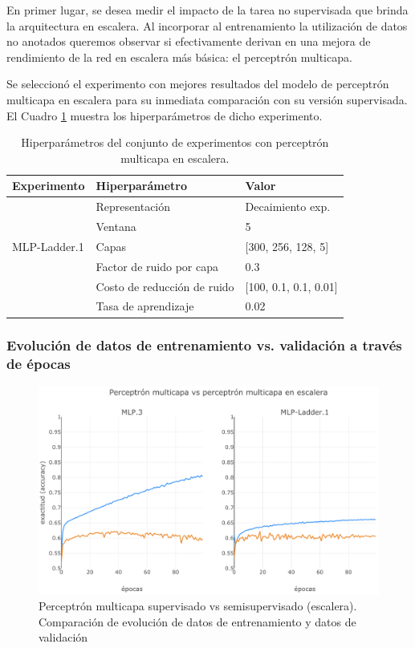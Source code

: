 En primer lugar, se desea medir el impacto de la tarea no supervisada que brinda la arquitectura en escalera. 
Al incorporar al entrenamiento la utilización de datos no anotados queremos observar si efectivamente derivan 
en una mejora de rendimiento de la red en escalera más básica: el perceptrón multicapa.

Se seleccionó el experimento con mejores resultados del modelo de perceptrón multicapa en escalera para su 
inmediata comparación con su versión supervisada. El Cuadro \ref{tab:exp:mlp_ladder} muestra los 
hiperparámetros de dicho experimento.

\begin{table}[t]
    \centering
    \begin{tabular}{|l|l|l|}
        \hline
        \textbf{Experimento} & \textbf{Hiperparámetro} & \textbf{Valor} \\
        \hline
        \multirow{5}{*}{MLP-Ladder.1} & Representación & Decaimiento exp. \\
                              & Ventana & 5 \\
                              & Capas & [300, 256, 128, 5] \\
                              & Factor de ruido por capa & 0.3 \\
                              & Costo de reducción de ruido & [100, 0.1, 0.1, 0.01] \\
                              & Tasa de aprendizaje & 0.02 \\
        \hline
    \end{tabular}
    \caption{Hiperparámetros del conjunto de experimentos con perceptrón multicapa en escalera.}
    \label{tab:exp:mlp_ladder}
\end{table}

\subsubsection{Evolución de datos de entrenamiento vs. validación a través de épocas}

\begin{figure}[t]
\begin{center}
\includegraphics[width=.9\linewidth]{images/MLP_supervised_ladder.png}
\caption{Perceptrón multicapa supervisado vs semisupervisado (escalera). Comparación de evolución de
datos de entrenamiento y datos de validación}
\label{fig:MLP_supervised_ladder}
\end{center}
\end{figure}

